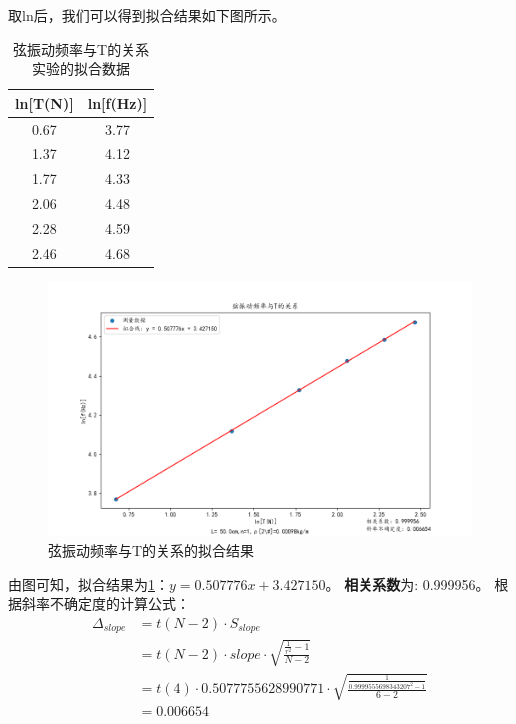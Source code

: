 取ln后，我们可以得到拟合结果如下图所示。
\begin{table}[h]
    \centering
    \begin{tabular}{|c|c|}
        \hline
        ln[T(N)] & ln[f(Hz)] \\
        \hline
        0.67     & 3.77      \\
        1.37     & 4.12      \\
        1.77     & 4.33      \\
        2.06     & 4.48      \\
        2.28     & 4.59      \\
        2.46     & 4.68      \\
        \hline
    \end{tabular}
    \caption{弦振动频率与T的关系实验的拟合数据}
    \label{2f68f884}
\end{table}
\begin{figure}[h]
    \centering
    \includegraphics[scale=0.5]{2.png}
    \caption{弦振动频率与T的关系的拟合结果}
    \label{ac188e73}
\end{figure}


由图可知，拟合结果为\ref{ac188e73}：$y=0.507776x+3.427150$。
\textbf{相关系数}为: 0.999956。
根据斜率不确定度的计算公式：
\begin{align}
    \Delta_{slope} & =t(N-2)\cdot S_{slope} \\ & = t(N-2)\cdot slope\cdot  \sqrt{\frac{\frac{1}{r^2}-1}{N-2}}\\ & = t(4)\cdot 0.5077755628990771\cdot \sqrt{\frac{\frac{1}{0.9999555698343207^2-1}}{6-2}} \\ &= 0.006654
\end{align}